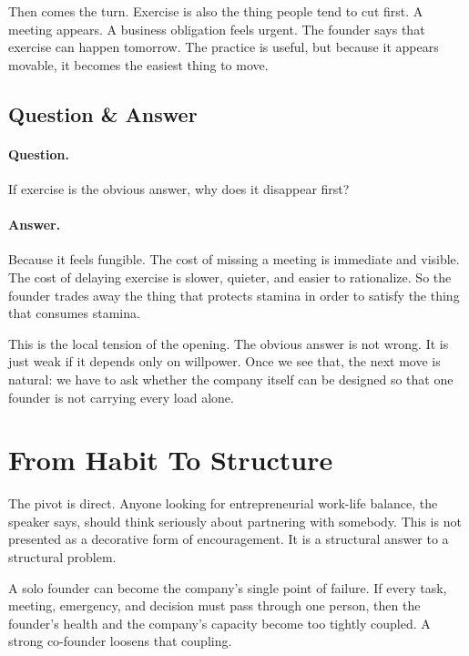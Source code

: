 Then comes the turn. Exercise is also the thing people tend to cut first. A meeting appears. A business obligation feels urgent. The founder says that exercise can happen tomorrow. The practice is useful, but because it appears movable, it becomes the easiest thing to move.

\subsection{Question \& Answer}

\paragraph{Question.}
If exercise is the obvious answer, why does it disappear first?

\paragraph{Answer.}
Because it feels fungible. The cost of missing a meeting is immediate and visible. The cost of delaying exercise is slower, quieter, and easier to rationalize. So the founder trades away the thing that protects stamina in order to satisfy the thing that consumes stamina.

This is the local tension of the opening. The obvious answer is not wrong. It is just weak if it depends only on willpower. Once we see that, the next move is natural: we have to ask whether the company itself can be designed so that one founder is not carrying every load alone.

\section{From Habit To Structure}

The pivot is direct. Anyone looking for entrepreneurial work-life balance, the speaker says, should think seriously about partnering with somebody. This is not presented as a decorative form of encouragement. It is a structural answer to a structural problem.

A solo founder can become the company's single point of failure. If every task, meeting, emergency, and decision must pass through one person, then the founder's health and the company's capacity become too tightly coupled. A strong co-founder loosens that coupling.

